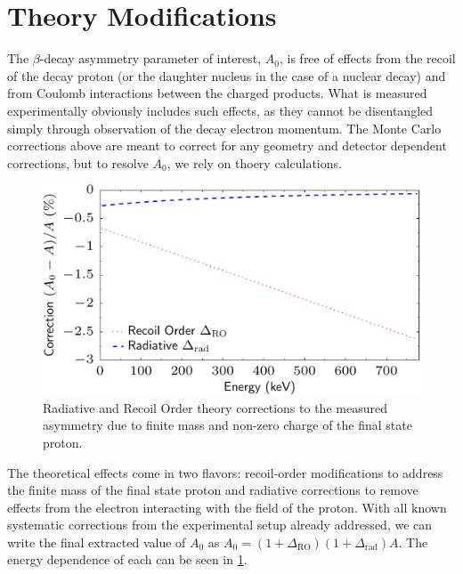 

\section{Theory Modifications} \label{ssec:deltaTh}

The $\beta$-decay asymmetry parameter of interest, $A_0$, is free of effects from the
recoil of the decay proton (or the daughter nucleus in the case of a nuclear decay) and
from Coulomb interactions between the charged products. What is measured
experimentally obviously includes such effects, as they cannot be disentangled simply through
observation of the decay electron momentum. The Monte Carlo corrections above are meant to correct for any geometry and
detector dependent corrections, but to resolve $A_0$, we rely on thoery calculations.

\begin{figure}[h]
  \centering
  \includegraphics[scale=0.7]{5-UCNAResults/TheoryUncert2011.pdf} 
  \caption{Radiative and Recoil Order theory corrections to the measured asymmetry
  due to finite mass and non-zero charge of the final state proton.}
  \label{fig:theoryCorr}
\end{figure}

The theoretical effects come in two flavors: recoil-order modifications to address the finite
mass of the final state proton and radiative corrections to remove effects from the electron
interacting with the field of the proton. With all known systematic corrections from the experimental
setup already addressed, we can write the final extracted value of $A_0$ as
$A_0 = (1+\Delta_{\mathrm{RO}})(1+\Delta_{\mathrm{rad}})A$. The energy dependence of each
can be seen in \ref{fig:theoryCorr}.

